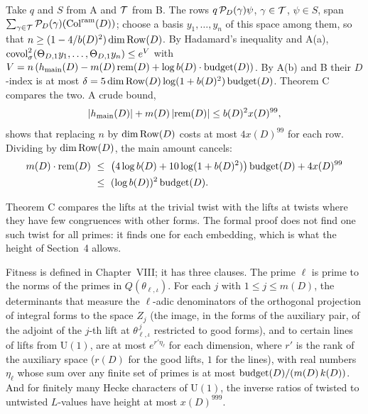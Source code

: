  Take $q$ and $S$ from A and $\mathcal{T}$ from B. The rows
$q\,\mathcal{P}_D(\gamma)\psi$, $\gamma\in\mathcal{T}$, $\psi\in S$, span $\sum_{\gamma\in\mathcal{T}}\mathcal{P}_D(\gamma)(\mathrm{Col}^{\mathrm{ram}}(D))$; choose a
basis $y_1,\dots,y_n$ of this space among them, so that $n\ge(1-4/b(D)^2)\dim\mathrm{Row}(D)$. By Hadamard's inequality and
A(a), $\operatorname{covol}_\sigma^2(\Theta_{D,1}y_1,\dots,\Theta_{D,1}y_n)\le e^{V}$ with
$V=n\,(h_{\mathrm{main}}(D)-m(D)\,\mathrm{rem}(D)+\log b(D)\cdot\mathrm{budget}(D))$. By A(b) and B their $D$-index is at most
$\delta=5\dim\mathrm{Row}(D)\log(1+b(D)^2)\,\mathrm{budget}(D)$. Theorem C compares the two. A crude bound,
\[|h_{\mathrm{main}}(D)|+m(D)\,|\mathrm{rem}(D)|\le b(D)^2x(D)^{99},\]
shows that replacing $n$ by $\dim\mathrm{Row}(D)$ costs at most $4x(D)^{99}$ for each
row. Dividing by $\dim\mathrm{Row}(D)$, the main amount cancels:
\[
\begin{aligned}
m(D)\cdot\mathrm{rem}(D)\ &\le\ \bigl(4\log b(D)+10\log(1+b(D)^2)\bigr)\,\mathrm{budget}(D)+4x(D)^{99}\\
&\le\ (\log b(D))^2\,\mathrm{budget}(D).
\end{aligned}
\]


Theorem C compares the lifts at the trivial twist with the lifts at twists where they have few congruences with
other forms. The formal proof does not find one such twist for all primes: it finds one for each embedding, which
is what the height of Section~4 allows.


Fitness is defined in Chapter~VIII; it has three clauses. The prime $\ell$ is prime to the norms of the primes in
$Q(\theta_{\ell,\iota})$. For each $j$ with $1\le j\le m(D)$,
the determinants that measure the $\ell$-adic denominators of the orthogonal projection of integral forms to the
space $Z_j$ (the image, in the forms of the auxiliary pair, of the adjoint of the $j$-th lift at
$\theta_{\ell,\iota}^{\,j}$ restricted to good forms), and to certain lines of lifts from $\mathrm{U}(1)$, are at most
$e^{r'\eta_\ell}$ for each dimension, where $r'$ is the rank of the auxiliary space ($r(D)$ for the good lifts, $1$ for
the lines), with real numbers $\eta_\ell$
whose sum over any finite set of primes is at most $\mathrm{budget}(D)/(m(D)\,k(D))$. And for finitely many Hecke characters
of $\mathrm{U}(1)$, the inverse ratios of twisted to untwisted $L$-values have height at most $x(D)^{999}$.

